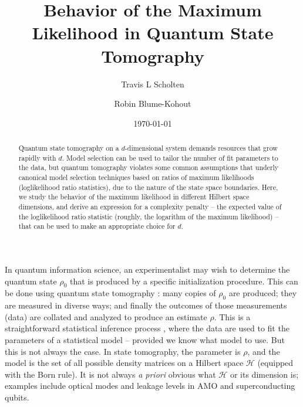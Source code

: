 \documentclass[aps,pra, twocolumn]{revtex4-1}
\newcommand{\cH}{\mathcal{H}}
\newcommand{\rhohat}{\hat{\rho}}
\begin{document}
\author{Travis L Scholten}
\author{Robin Blume-Kohout}

\title{Behavior of the Maximum Likelihood in Quantum State Tomography}

\begin{abstract}
Quantum state tomography on a $d$-dimensional system demands resources that grow rapidly with $d$. Model selection can be used to tailor the number of fit parameters to the data, but quantum tomography violates some common assumptions that underly canonical model selection techniques based on ratios of maximum likelihoods (loglikelihood ratio statistics), due to the nature of the state space boundaries. Here, we study the behavior of the maximum likelihood  in different Hilbert space dimensions, and derive an expression for a complexity penalty -- the expected value of the loglikelihood ratio statistic (roughly, the logarithm of the maximum likelihood) -- that can be used to make an appropriate choice for $d$.
\end{abstract}
\date{\today}

\maketitle

In quantum information science, an experimentalist may wish to determine the quantum state $\rho_{0}$ that is produced by a specific initialization procedure.  This can be done using quantum state tomography \cite{Paris2004}:  many copies of $\rho_{0}$ are produced; they are measured in diverse ways; and finally the outcomes of those measurements (data) are collated and analyzed to produce an estimate $\rhohat$.  This is a straightforward statistical inference process \cite{Reid2015, Wasserman2004}, where the data are used to fit the parameters of a statistical model -- provided  we know what  model to use.  But this is not always the case.  In state tomography, the parameter is $\rho$, and the model is the set of all possible density matrices on a Hilbert space $\cH$ (equipped with the Born rule). It is not always \emph{a priori} obvious what $\cH$ or its dimension is; examples include optical modes \cite{Altepeter2005, Bertrand1987, Lvovsky2009, Breitenbach1997, Leonhardt1995} and leakage levels in AMO and superconducting \cite{Motzoi2009, Fazio1999} qubits. 
\end{document}

